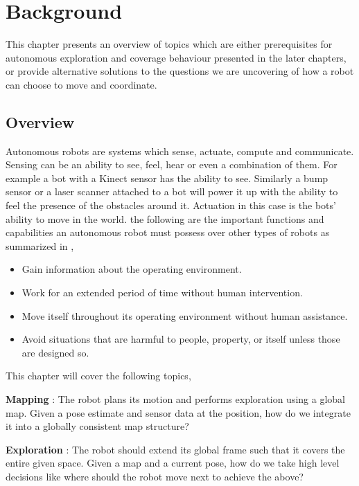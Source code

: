 \chapter{Background}
This chapter presents an overview of topics which are either prerequisites for autonomous exploration and coverage behaviour presented in the later chapters, or provide alternative solutions to the questions we are uncovering of how a robot can choose to move and coordinate.

\section{Overview}
Autonomous robots are systems which sense, actuate, compute and communicate. Sensing can be an ability to see, feel, hear or even a combination of them. For example a bot with a Kinect sensor has the ability to see. Similarly a bump sensor or a laser scanner attached to a bot will power it up with the ability to feel the presence of the obstacles around it. Actuation in this case is the bots' ability to move in the world. the following are the important functions and capabilities an autonomous robot 
must possess over other types of robots as summarized in \cite{7},
\begin{itemize}
    \item Gain information about the operating environment.
    \item Work for an extended period of time without human intervention.
    \item Move itself throughout its operating environment without human assistance.
    \item Avoid situations that are harmful to people, property, or itself unless those are designed so.
\end{itemize}
\vspace{5em}
This chapter will cover the following topics,

\par \textbf{Mapping} : The robot plans its motion and performs exploration using a global map. Given a pose estimate and sensor data at the position, how do we integrate it into a globally consistent map structure?

\par \textbf{Exploration} : The robot should extend its global frame such that it covers the entire given space. Given a map and a current pose, how do we take high level decisions like where should the robot move next to achieve the above? 

